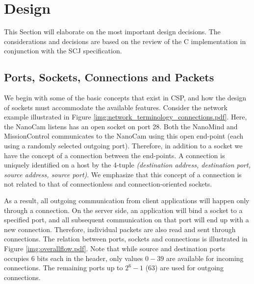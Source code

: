 \section{Design}
This Section will elaborate on the most important design decisions. The considerations and decisions are based on the review of the C implementation in conjunction with the SCJ specification.

\subsection{Ports, Sockets, Connections and Packets}
We begin with some of the basic concepts that exist in CSP, and how the design of sockets must accommodate the available features. Consider the network example illustrated in Figure \ref{img:network_terminology_connections.pdf}. Here, the NanoCam listens has an open socket on port 28. Both the NanoMind and MissionControl communicates to the NanoCam using this open end-point (each using a randomly selected outgoing port). Therefore, in addition to a socket we have the concept of a connection between the end-points. A connection is uniquely identified on a host by the 4-tuple \textit{(destination address, destination port, source address, source port)}. We emphasize that this concept of a connection is not related to that of connectionless and connection-oriented sockets.

As a result, all outgoing communication from client applications will happen only through a connection. On the server side, an application will bind a socket to a specified port, and all subsequent communication on that port will end up with a new connection. Therefore, individual packets are also read and sent through connections. The relation between ports, sockets and connections is illustrated in Figure \ref{img:overallflow.pdf}. Note that while source and destination ports occupies 6 bits each in the header, only values $0-39$ are available for incoming connections. The remaining ports up to $2^6-1$ (63) are used for outgoing connections.

